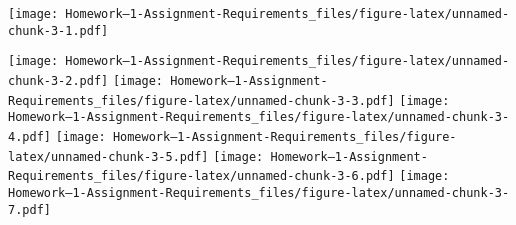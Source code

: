 \documentclass[
]{article}
\newenvironment{Shaded}{\begin{snugshade}}{\end{snugshade}}
\newcommand{\AttributeTok}[1]{\textcolor[rgb]{0.13,0.29,0.53}{#1}}
\newcommand{\CommentTok}[1]{\textcolor[rgb]{0.56,0.35,0.01}{\textit{#1}}}
\newcommand{\ConstantTok}[1]{\textcolor[rgb]{0.56,0.35,0.01}{#1}}
\newcommand{\ControlFlowTok}[1]{\textcolor[rgb]{0.13,0.29,0.53}{\textbf{#1}}}
\newcommand{\DecValTok}[1]{\textcolor[rgb]{0.00,0.00,0.81}{#1}}
\newcommand{\FunctionTok}[1]{\textcolor[rgb]{0.13,0.29,0.53}{\textbf{#1}}}
\newcommand{\NormalTok}[1]{#1}
\newcommand{\OtherTok}[1]{\textcolor[rgb]{0.56,0.35,0.01}{#1}}
\newcommand{\SpecialCharTok}[1]{\textcolor[rgb]{0.81,0.36,0.00}{\textbf{#1}}}
\newcommand{\StringTok}[1]{\textcolor[rgb]{0.31,0.60,0.02}{#1}}
\begin{document}
\texttt{[image: Homework--1-Assignment-Requirements\_files/figure-latex/unnamed-chunk-3-1.pdf]}

\begin{Shaded}
\end{Shaded}

\texttt{[image: Homework--1-Assignment-Requirements\_files/figure-latex/unnamed-chunk-3-2.pdf]}
\texttt{[image: Homework--1-Assignment-Requirements\_files/figure-latex/unnamed-chunk-3-3.pdf]}
\texttt{[image: Homework--1-Assignment-Requirements\_files/figure-latex/unnamed-chunk-3-4.pdf]}
\texttt{[image: Homework--1-Assignment-Requirements\_files/figure-latex/unnamed-chunk-3-5.pdf]}
\texttt{[image: Homework--1-Assignment-Requirements\_files/figure-latex/unnamed-chunk-3-6.pdf]}
\texttt{[image: Homework--1-Assignment-Requirements\_files/figure-latex/unnamed-chunk-3-7.pdf]}
\end{document}
